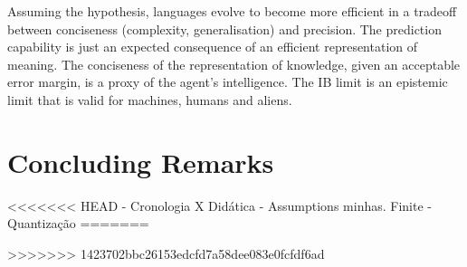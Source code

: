     Assuming the hypothesis, languages evolve to become more efficient in a tradeoff between conciseness (complexity, generalisation) and precision. The prediction capability is just an expected consequence of an efficient representation of meaning. The conciseness of the representation of knowledge, given an acceptable error margin, is a proxy of the agent's intelligence. The IB limit is an epistemic limit that is valid for machines, humans and aliens.

\section{Concluding Remarks}

<<<<<<< HEAD
- Cronologia X Didática
- Assumptions minhas. Finite
- Quantização
=======

>>>>>>> 1423702bbc26153edcfd7a58dee083e0fcfdf6ad





